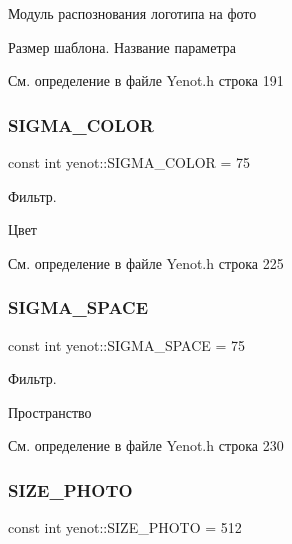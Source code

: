 Модуль распознования логотипа на фото

Размер шаблона. Название параметра 

См. определение в файле Yenot.\+h строка 191

\mbox{\label{namespaceyenot_affd7404833d15c98fbd85249f43f98da}} 
\subsubsection{\texorpdfstring{S\+I\+G\+M\+A\+\_\+\+C\+O\+L\+OR}{SIGMA\_COLOR}}
{\footnotesize\ttfamily const int yenot\+::\+S\+I\+G\+M\+A\+\_\+\+C\+O\+L\+OR = 75}

Фильтр.

Цвет 

См. определение в файле Yenot.\+h строка 225

\mbox{\label{namespaceyenot_ad45191f613b95ca3398e6eab5e202406}} 
\subsubsection{\texorpdfstring{S\+I\+G\+M\+A\+\_\+\+S\+P\+A\+CE}{SIGMA\_SPACE}}
{\footnotesize\ttfamily const int yenot\+::\+S\+I\+G\+M\+A\+\_\+\+S\+P\+A\+CE = 75}

Фильтр.

Пространство 

См. определение в файле Yenot.\+h строка 230

\mbox{\label{namespaceyenot_a501462c649059c5efe3019823a607670}} 
\subsubsection{\texorpdfstring{S\+I\+Z\+E\+\_\+\+P\+H\+O\+TO}{SIZE\_PHOTO}}
{\footnotesize\ttfamily const int yenot\+::\+S\+I\+Z\+E\+\_\+\+P\+H\+O\+TO = 512}

